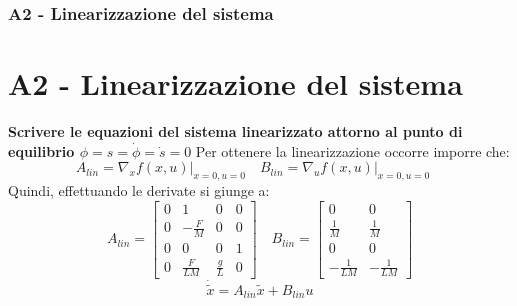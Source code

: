 \documentclass{beamer}
\begin{document}
\begin{frame}
	\frametitle{A2 - Linearizzazione del sistema} %
	\section{A2 - Linearizzazione del sistema} %
	\textbf{Scrivere le equazioni del sistema linearizzato attorno al punto di equilibrio \(\phi=s=\dot{\phi}=\dot{s}=0\)}
	Per ottenere la linearizzazione occorre imporre che:\begin{equation*}
		A_{lin}=\nabla_{x}f(x,u)\lvert_{x=0,u=0}\quad
		B_{lin}=\nabla_{u}f(x,u)\lvert_{x=0,u=0}\quad
	\end{equation*}
	Quindi, effettuando le derivate si giunge a:
	\begin{equation*}
		A_{lin}=\begin{bmatrix}
			0 & 1            & 0           & 0 \\
			0 & -\frac{F}{M} & 0           & 0 \\
			0 & 0            & 0           & 1 \\
			0 & \frac{F}{LM} & \frac{g}{L} & 0
		\end{bmatrix}
		\quad B_{lin}=\begin{bmatrix}
			0 & 0 \\\frac{1}{M}&\frac{1}{M}\\0&0\\-\frac{1}{LM}&-\frac{1}{LM}
		\end{bmatrix}
	\end{equation*}
	\begin{equation*}
		\dot{\tilde{x}}=A_{lin}\tilde{x}+B_{lin}u
	\end{equation*}
\end{frame}
\end{document}
